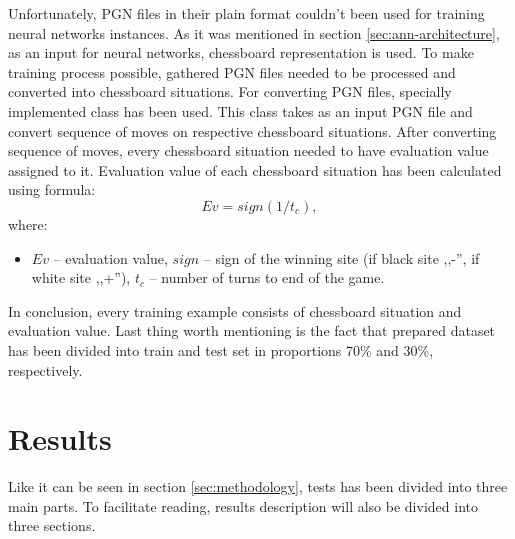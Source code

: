 Unfortunately, PGN files in their plain format couldn't been used for training neural networks instances. As it was mentioned in section \ref{sec:ann-architecture}, as an input for neural networks, chessboard representation is used. To make training process possible, gathered PGN files needed to be processed and converted into chessboard situations. For converting PGN files, specially implemented class has been used. This class takes as an input PGN file and convert sequence of moves on respective chessboard situations. After converting sequence of moves, every chessboard situation needed to have evaluation value assigned to it. Evaluation value of each chessboard situation has been calculated using formula:
\begin{equation}\label{eq:evaluation-equation-pgn}
    Ev = sign\left(1/t_c\right),
\end{equation}
where:
\begin{itemize}[label=]
    \item $Ev$ -- evaluation value, $sign$ -- sign of the winning site (if black site ,,-'', if white site ,,+''), $t_c$ -- number of turns to end of the game.
\end{itemize}
In conclusion, every training example consists of chessboard situation and evaluation value. Last thing worth mentioning is the fact that prepared dataset has been divided into train and test set in proportions 70\% and 30\%, respectively.

\section{Results}
Like it can be seen in section \ref{sec:methodology}, tests has been divided into three main parts. To facilitate reading, results description will also be divided into three sections.

